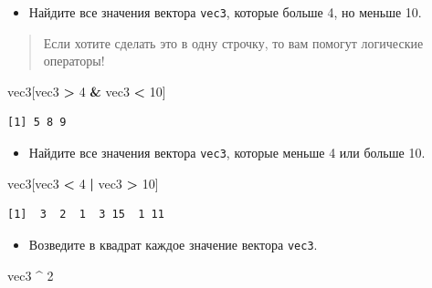 \documentclass[
]{book}
\newenvironment{Shaded}{\begin{snugshade}}{\end{snugshade}}
\newcommand{\DecValTok}[1]{\textcolor[rgb]{0.00,0.00,0.81}{#1}}
\newcommand{\NormalTok}[1]{#1}
\newcommand{\OperatorTok}[1]{\textcolor[rgb]{0.81,0.36,0.00}{\textbf{#1}}}
\newcommand{\StringTok}[1]{\textcolor[rgb]{0.31,0.60,0.02}{#1}}
\providecommand{\tightlist}{%
  \setlength{\itemsep}{0pt}\setlength{\parskip}{0pt}}
\begin{document}
\begin{itemize}
\tightlist
\item
  Найдите все значения вектора \texttt{vec3}, которые больше 4, но меньше 10.
\end{itemize}

\begin{quote}
Если хотите сделать это в одну строчку, то вам помогут логические операторы!
\end{quote}

\begin{Shaded}
\begin{Highlighting}[]
\NormalTok{vec3[vec3 }\OperatorTok{>}\StringTok{ }\DecValTok{4} \OperatorTok{&}\StringTok{ }\NormalTok{vec3 }\OperatorTok{<}\StringTok{ }\DecValTok{10}\NormalTok{]}
\end{Highlighting}
\end{Shaded}

\begin{verbatim}
[1] 5 8 9
\end{verbatim}

\begin{itemize}
\tightlist
\item
  Найдите все значения вектора \texttt{vec3}, которые меньше 4 или больше 10.
\end{itemize}

\begin{Shaded}
\begin{Highlighting}[]
\NormalTok{vec3[vec3 }\OperatorTok{<}\StringTok{ }\DecValTok{4} \OperatorTok{|}\StringTok{ }\NormalTok{vec3 }\OperatorTok{>}\StringTok{ }\DecValTok{10}\NormalTok{]}
\end{Highlighting}
\end{Shaded}

\begin{verbatim}
[1]  3  2  1  3 15  1 11
\end{verbatim}

\begin{itemize}
\tightlist
\item
  Возведите в квадрат каждое значение вектора \texttt{vec3}.
\end{itemize}

\begin{Shaded}
\begin{Highlighting}[]
\NormalTok{vec3 }\OperatorTok{^}\StringTok{ }\DecValTok{2}
\end{Highlighting}
\end{Shaded}
\end{document}
